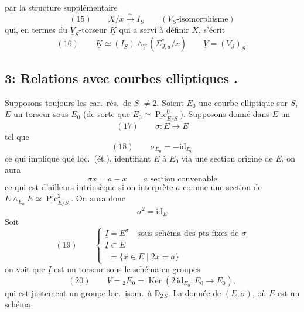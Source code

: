 \documentclass[11pt,a4paper]{article}
\begin{document}
 par la structure supplémentaire
\[
  (15) \qquad X/x \xrightarrow{\;\sim\;} I_S \qquad (V_S\text{-isomorphisme})
\]
qui, en termes du $\underline{V}_S$-torseur $\underline{K}$ qui a servi à définir
$X$, s'écrit
\[
  (16) \qquad \underline{K} \simeq (I_S) \wedge_{\underline{V}} (\Sigma^*_{J,a}/x)
  \qquad \underline{V} = (V_J)_S .
\]

\subsection{3: Relations avec courbes elliptiques .}

Supposons toujours les car.\ rés.\ de $S$ $\neq 2$. Soient $E_0$ une courbe
elliptique sur $S$, $E$ un torseur sous $E_0$ (de sorte que
$E_0 \simeq \underline{\operatorname{Pic}}^0_{E/S}$). Supposons donné dans $E$
un \struck{\ill{}} 
\[
  (17) \qquad \sigma : E \to E
\]
tel que
\[
  (18) \qquad \sigma_{E_0} = -\mathrm{id}_{E_0}
\]
ce qui implique que loc.\ (ét.), identifiant $E$ à $E_0$ via une section
origine de $E$, on aura
\[
  \sigma x = a - x \qquad a \text{ section convenable}
\]
ce qui est d'ailleurs intrinsèque si on interprète $a$ comme une section de
$E \wedge_{E_0} E \simeq \underline{\operatorname{Pic}}^2_{E/S}$. On aura donc
\[
  \sigma^2 = \mathrm{id}_E
\]
Soit \struck{\ill{}}
\[
  (19) \qquad
  \begin{cases}
    \underline{I} = E^\sigma \quad \text{sous-schéma des pts fixes de } \sigma \\
    \underline{I} \subset E \\
    \phantom{\underline{I}} = \{x \in E \mid 2x = a\}
  \end{cases}
\]
on voit que $\underline{I}$ est un torseur sous le schéma en groupes
\[
  (20) \qquad \underline{V} = {}_2E_0 = \operatorname{Ker}(2\,\mathrm{id}_{E_0} : E_0 \to E_0),
\]
qui est justement un groupe  loc.\ isom.\ à $\mathbb{D}_{2\,S}$.
La donnée de $(E, \sigma)$, où $E$ est un schéma
\end{document}
